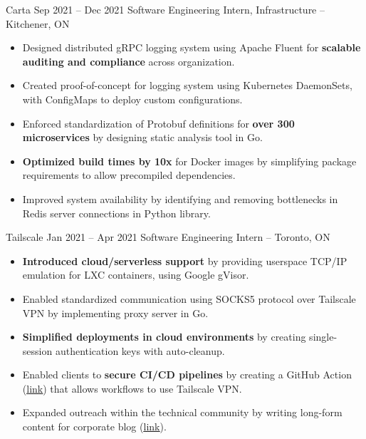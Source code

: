 \documentclass{article}
\begin{document}
\normalsize
\WorkEntry
{Carta}
{Sep 2021 -- Dec 2021}
{Software Engineering Intern, Infrastructure -- Kitchener, ON}
{
\begin{itemize} \itemsep -1pt
    \item Designed distributed gRPC logging system using Apache Fluent for \textbf{scalable auditing and compliance} across organization.
    \item Created proof-of-concept for logging system using Kubernetes DaemonSets, with ConfigMaps to deploy custom configurations.
    \item Enforced standardization of Protobuf definitions for \textbf{over 300 microservices} by designing static analysis tool in Go.
    \item \textbf{Optimized build times by 10x} for Docker images by simplifying package requirements to allow precompiled dependencies.
    \item Improved system availability by identifying and removing bottlenecks in Redis server connections in Python library.
\end{itemize}}
\iffalse
Made Tailscale ready for the cloud, by creating features that allowed it to run in lightweight, unprivileged container environments. This included a virtual networking stack for connecting to the Tailscale network without kernel privileges to create a network driver, a SOCKS5 proxy to allow applications to communicate over this virtual networking stack, and ephemeral authentication keys for stateless access to the Tailscale network. Also published long-form technical content on company blog (https://tailscale.com/blog/2021-05-github-actions-and-tailscale/) and contributed to product knowledge base.
\fi
\WorkEntry
{Tailscale}
{Jan 2021 -- Apr 2021}
{Software Engineering Intern -- Toronto, ON}
{\begin{itemize} \itemsep -1pt
    \item \textbf{Introduced cloud/serverless support} by providing userspace TCP/IP emulation for LXC containers, using Google gVisor.
    \item Enabled standardized communication using SOCKS5 protocol over Tailscale VPN by implementing proxy server in Go.
    \item \textbf{Simplified deployments in cloud environments} by creating single-session authentication keys with auto-cleanup.
    \item Enabled clients to \textbf{secure CI/CD pipelines} by creating a GitHub Action (\underline{\href{https://github.com/tailscale/github-action}{link}}) that allows workflows to use Tailscale VPN. %
    \item Expanded outreach within the technical community by writing long-form content for corporate blog (\underline{\href{https://tailscale.com/blog/2021-05-github-actions-and-tailscale/}{link}}).
    \end{itemize}}
\end{document}
